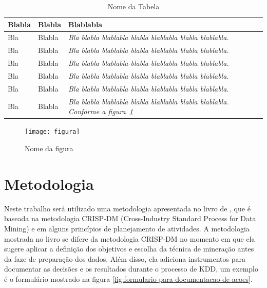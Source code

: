 \documentclass[diss,capa]{texufpel}
\begin{document}
\begin{table}
\begin{center}
\caption{Nome da Tabela}\label{tabela2}
\begin{tabular}{p{4cm}p{5cm}p{6cm}}
\hline
Blabla & Blabla & Blablabla\\
\hline
{\small Bla} & {\small Blabla} & {\small\em Bla blabla blablabla blabla
  blablabla blabla blablabla.}\\
{\small Bla} & {\small Blabla} & {\small\em Bla blabla blablabla blabla
  blablabla blabla blablabla.}\\
{\small Bla} & {\small Blabla} & {\small\em Bla blabla blablabla blabla
  blablabla blabla blablabla.}\\
{\small Bla} & {\small Blabla} & {\small\em Bla blabla blablabla blabla
  blablabla blabla blablabla.}\\
{\small Bla} & {\small Blabla} & {\small\em Bla blabla blablabla blabla
  blablabla blabla blablabla.}\\
{\small Bla} & {\small Blabla} & {\small\em Bla blabla blablabla blabla
  blablabla blabla blablabla. Conforme a figura~\ref{figura}}\\
\hline
\end{tabular}
\end{center}
\end{table}

\begin{figure}[htbp]
  \centering \texttt{[image: figura]}
\caption{Nome da figura} 
\label{figura}
\end{figure}



\chapter{Metodologia}


Neste trabalho será utilizado uma metodologia apresentada no livro de \citet{goldschmidt2015data}, que é baseada na metodologia CRISP-DM (Cross-Industry Standard Process for Data Mining) e em alguns princípios de planejamento de atividades. A metodologia mostrada no livro se difere da metodologia CRISP-DM no momento em que ela sugere aplicar a definição dos objetivos e escolha da técnica de mineração antes da faze de preparação dos dados. Além disso, ela adiciona instrumentos para documentar as decisões e os resultados durante o processo de KDD, um exemplo é o formulário mostrado na figura \ref{fig:formulario-para-documentacao-de-acoes}.
\end{document}
